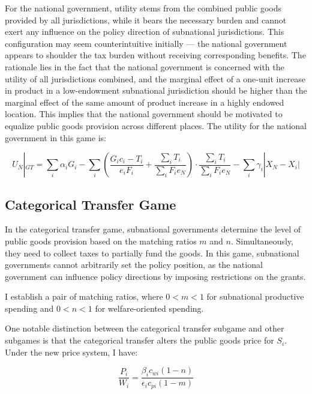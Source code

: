 \documentclass[man]{apa7}
\begin{document}
For the national government, utility stems from the combined public goods provided by all jurisdictions, while it bears the necessary burden and cannot exert any influence on the policy direction of subnational jurisdictions. This configuration may seem counterintuitive initially — the national government appears to shoulder the tax burden without receiving corresponding benefits. The rationale lies in the fact that the national government is concerned with the utility of all jurisdictions combined, and the marginal effect of a one-unit increase in product in a low-endowment subnational jurisdiction should be higher than the marginal effect of the same amount of product increase in a highly endowed location. This implies that the national government should be motivated to equalize public goods provision across different places. The utility for the national government in this game is: %

\begin{equation}
  U_N|_{GT}=\sum_i \alpha_i G_i-\sum_i(\frac{G_ic_i-T_i}{e_iF_i}+\frac{\sum_iT_i}{\sum_iF_ie_N})\cdot \frac{\sum_iT_i}{\sum_iF_ie_N}-\sum_i \gamma_i|X_N-X_i|
\end{equation}

\subsection{Categorical Transfer Game}

In the categorical transfer game, subnational governments determine the level of public goods provision based on the matching ratios $m$ and $n$. Simultaneously, they need to collect taxes to partially fund the goods. In this game, subnational governments cannot arbitrarily set the policy position, as the national government can influence policy directions by imposing restrictions on the grants.

I establish a pair of matching ratios, where $0 < m < 1$ for subnational productive spending and $0 < n < 1$ for welfare-oriented spending.

One notable distinction between the categorical transfer subgame and other subgames is that the categorical transfer alters the public goods price for $S_i$. Under the new price system, I have:%

\begin{equation}
  \frac{P_i}{W_i}=\frac{\beta_ic_{wi}(1-n)}{\epsilon_ic_{pi}(1-m)}
\end{equation}
\end{document}
